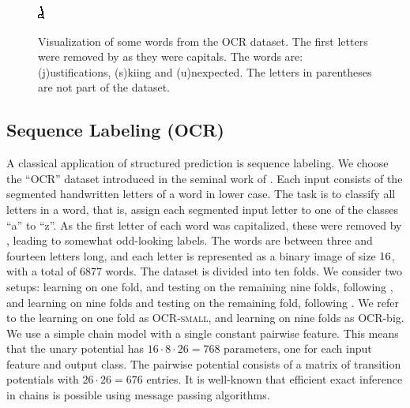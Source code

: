 \begin{figure}
    \includegraphics[width=.068\linewidth, frame]{evaluation/images/unexpected_08}\\
    \caption{%
        Visualization of some words from the OCR dataset. The first letters were removed by \citet{taskar2003max} as 
        they were capitals.
        The words are: (j)ustifications, (s)kiing and (u)nexpected. The letters in parentheses are not part of the dataset.
    }
\end{figure}
\subsection{Sequence Labeling (OCR)}
A classical application of structured prediction is sequence labeling.
We choose the ``OCR'' dataset introduced in the seminal work of \citet{taskar2003max}.
Each input consists of the segmented handwritten letters of a word in lower
case. The task is to classify all letters in a word, that is, assign each
segmented input letter to one of the classes ``a'' to ``z''. As the first letter
of each word was capitalized, these were removed by \citet{taskar2003max},
leading to somewhat odd-looking labels. The words are between three and fourteen
letters long, and each letter is represented as a binary image of size $16
\time 8$, with a total of $6877$ words.
The dataset is divided into ten folds. We consider two setups: learning
on one fold, and testing on the remaining nine folds, following \citet{taskar2003max},
and learning on nine folds and testing on the remaining fold, following \citet{lacoste2012block}.
We refer to the learning on one fold as \textsc{OCR-small}, and learning on nine folds as OCR-big.
We use a simple chain model with a single constant pairwise feature.
This means that the unary potential has $16 \cdot 8 \cdot 26 = 768$ parameters, one for each input
feature and output class. The pairwise potential consists of a matrix of
transition potentials with $26 \cdot 26=676$ entries.
It is well-known that efficient exact inference in chains is possible using
message passing algorithms. 


